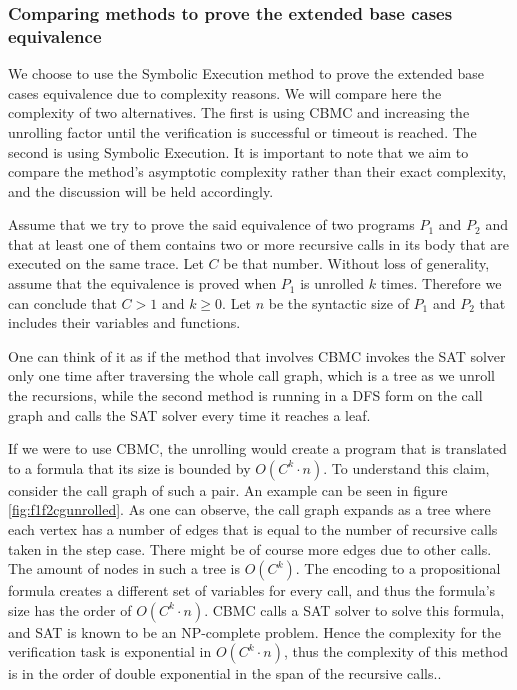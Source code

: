 \subsubsection{Comparing methods to prove the extended base cases equivalence}
We choose to use the Symbolic Execution method to prove the extended base cases equivalence due to complexity reasons. We will compare here the complexity of two alternatives. The first is using CBMC and increasing the unrolling factor until the verification is successful or timeout is reached. The second is using Symbolic Execution. It is important to note that we aim to compare the method's asymptotic complexity rather than their exact complexity, and the discussion will be held accordingly.  

Assume that we try to prove the said equivalence of two programs $P_1$ and $P_2$ and that at least one of them contains two or more recursive calls in its body that are executed on the same trace. Let $C$ be that number. Without loss of generality, assume that the equivalence is proved when $P_1$ is unrolled $k$ times. Therefore we can conclude that $C > 1$ and $k \geq 0$. Let $n$ be the syntactic size of $P_1$ and $P_2$ that includes their variables and functions. 

One can think of it as if the method that involves CBMC invokes the SAT solver only one time after traversing the whole call graph, which is a tree as we unroll the recursions, while the second method is running in a DFS form on the call graph and calls the SAT solver every time it reaches a leaf.

If we were to use CBMC, the unrolling would create a program that is translated to a formula that its size is bounded by $O(C^k{\cdot}n)$. To understand this claim, consider the call graph of such a pair. An example can be seen in figure \ref{fig:f1f2cgunrolled}. As one can observe, the call graph expands as a tree where each vertex has a number of edges that is equal to the number of recursive calls taken in the step case. There might be of course more edges due to other calls. The amount of nodes in such a tree is $O(C^k)$. The encoding to a propositional formula creates a different set of variables for every call, and thus the formula's size has the order of $O(C^k{\cdot}n)$. CBMC calls a SAT solver to solve this formula, and SAT is known to be an NP-complete problem. Hence the complexity for the verification task is exponential in $O(C^k{\cdot}n)$, thus the complexity of this method is in the order of double exponential in the span of the recursive calls..  

